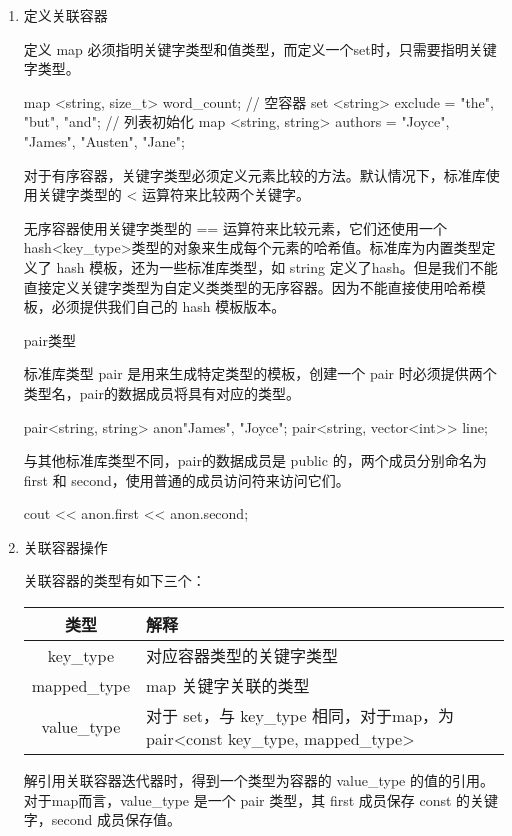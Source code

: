 \begin{enumerate}
\item 定义关联容器

定义 map 必须指明关键字类型和值类型，而定义一个set时，只需要指明关键字类型。
\begin{Code}
map <string, size_t> word_count; // 空容器
set <string> exclude = {"the", "but", "and"}; // 列表初始化
map <string, string> authors = {{"Joyce", "James"},
	{"Austen", "Jane"}};
\end{Code}
对于有序容器，关键字类型必须定义元素比较的方法。默认情况下，标准库使用关键字类型的 < 运算符来比较两个关键字。

无序容器使用关键字类型的 == 运算符来比较元素，它们还使用一个hash<key_type>类型的对象来生成每个元素的哈希值。标准库为内置类型定义了 hash 模板，还为一些标准库类型，如 string 定义了hash。但是我们不能直接定义关键字类型为自定义类类型的无序容器。因为不能直接使用哈希模板，必须提供我们自己的 hash 模板版本。

\subitem pair类型

标准库类型 pair 是用来生成特定类型的模板，创建一个 pair 时必须提供两个类型名，pair的数据成员将具有对应的类型。
\begin{Code}
pair<string, string> anon{"James", "Joyce"};
pair<string, vector<int>> line;
\end{Code}
与其他标准库类型不同，pair的数据成员是 public 的，两个成员分别命名为 first 和 second，使用普通的成员访问符来访问它们。
\begin{Code}
cout << anon.first << anon.second;
\end{Code}

\item 关联容器操作

关联容器的类型有如下三个：
\begin{table}[hbp]
	\begin{tabular}{|c|l|}
		\hline
类型& 解释\\\hline
key_type &对应容器类型的关键字类型 \\ \hline
 mapped_type& map 关键字关联的类型 \\ \hline
 value_type& 对于 set，与 key_type 相同，对于map，为 pair<const key_type, mapped_type> \\ \hline
	\end{tabular}
\end{table}

解引用关联容器迭代器时，得到一个类型为容器的 value_type 的值的引用。对于map而言，value_type 是一个 pair 类型，其 first 成员保存 const 的关键字，second 成员保存值。


\end{enumerate}
